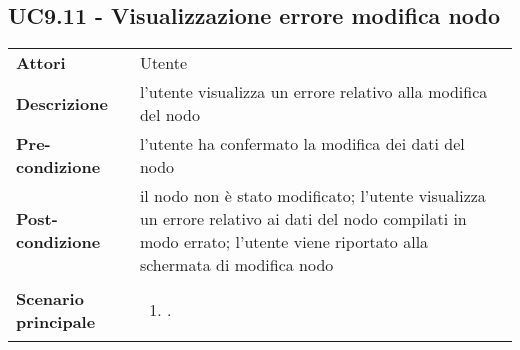 \subsection{UC9.11 - Visualizzazione errore modifica nodo} 
\label{sssec:UC9.11} 
\def\arraystretch{1.5}
\begin{tabularx}{\textwidth}{l|p{}}
	\rowcolor{I} \multicolumn{2}{c}{\color{white}\textbf{UC9.11 - Visualizzazione errore modifica nodo}} \\
	\toprule
	\endhead
	\textbf{Attori} & Utente\\
	\textbf{Descrizione} & l'utente visualizza un errore relativo alla modifica del nodo\\
	\textbf{Pre-condizione} & l'utente ha confermato la modifica dei dati del nodo\\
	\textbf{Post-condizione} & il nodo non è stato modificato; l'utente visualizza un errore relativo ai dati del nodo compilati in modo errato; l'utente viene riportato alla schermata di modifica nodo\\
	\textbf{Scenario principale} & \vspace{-1.2em}\begin{enumerate}[leftmargin=*,noitemsep,nosep]
		\item \nameref{sssec:UC9.11}.
	\end{enumerate}\\
	\bottomrule
\end{tabularx}
